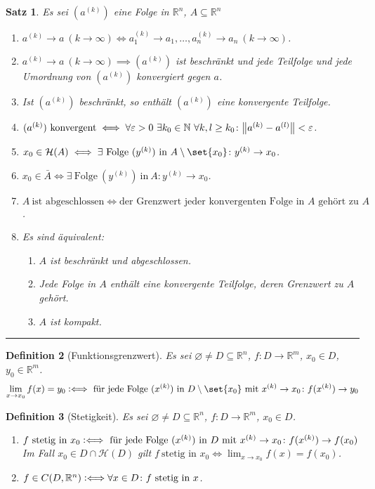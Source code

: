 \documentclass[a4paper]{article}
\newcounter{Sec}
\theoremstyle{marginbreak}
\newtheorem{definition}{Definition}[Sec]
\newtheorem{satz}[definition]{Satz}
\newcommand{\sep}{%
	\rule{\textwidth}{0.3pt}%
	\stepcounter{Sec}%
	}
\newcommand{\defiff}{\mathrel{\vcentcolon\Longleftrightarrow}}
\begin{document}
	\begin{satz}
		Es sei $(a^{(k)})$ eine Folge in $\mathbb{R}^n$, $A\subseteq\mathbb{R}^n$
		\begin{enumerate}[label=(\alph*)]
			\item $a^{(k)}\to a\ (k\to\infty)\iff a_1^{(k)}\to a_1,\ldots,a_n^{(k)}\to a_n\ (k\to\infty)$.
			\item $a^{(k)}\to a\ (k\to\infty)\implies (a^{(k)})$ ist beschränkt und jede Teilfolge und jede Umordnung
				von $(a^{(k)})$ konvergiert gegen $a$.
			\item Ist $(a^{(k)})$ beschränkt, so enthält $(a^{(k)})$ eine konvergente Teilfolge.
			\item $(a^{(k)})\ \text{konvergent}\iff\forall\varepsilon>0\ \exists k_0\in\mathbb{N}\ \forall k, l\geq k_0\colon
				\norm{a^{(k)} - a^{(l)}}<\varepsilon$.
			\item $x_0\in\mathcal{H}(A) \iff\exists\ \text{Folge}\ (y^{(k)})\ \text{in}\ A\setminus\set{x_0}\colon y^{(k)}\to x_0$.
			\item $x_0\in\bar{A}\iff\exists\ \text{Folge}\ (y^{(k)})\ \text{in}\ A\colon y^{(k)}\to x_0$.
			\item $A\ \text{ist abgeschlossen} \iff \text{der Grenzwert jeder konvergenten Folge in $A$ gehört zu $A$}$.
			\item Es sind äquivalent:
				\begin{enumerate}[label=(\roman*)]
					\item $A$ ist beschränkt und abgeschlossen.
					\item Jede Folge in $A$ enthält eine konvergente Teilfolge, deren Grenzwert zu $A$ gehört.
					\item $A$ ist kompakt.
				\end{enumerate}
		\end{enumerate}
	\end{satz}
	\sep
	\begin{definition}[Funktionsgrenzwert]
		Es sei $\varnothing\neq D\subseteq\mathbb{R}^n$, $f\colon D\to\mathbb{R}^m$, $x_0\in D$, $y_0\in\mathbb{R}^m$.
		\[\lim_{x\to x_0}f(x) = y_0\defiff\ \text{für jede Folge $(x^{(k)})$ in $D\setminus\set{x_0}$ mit $x^{(k)}\to x_0$}\colon
		f(x^{(k)})\to y_0\]
	\end{definition}
	\begin{definition}[Stetigkeit]
		Es sei $\varnothing\neq D\subseteq\mathbb{R}^n$, $f\colon D\to\mathbb{R}^m$, $x_0\in D$.
		\begin{enumerate}[label=(\alph*)]
			\item
				$f\ \text{stetig in $x_0$}\defiff\ \text{für jede Folge $(x^{(k)})$ in $D$ mit $x^{(k)}\to x_0$}\colon f(x^{(k)})\to f(x_0)$
				Im Fall $x_0\in D\cap\mathcal{H}(D)$ gilt $f\ \text{stetig in $x_0$}\iff \lim_{x\to x_0} f(x) = f(x_0)$.
			\item $f\in C(D, \mathbb{R}^n)\defiff\forall x\in D\colon f\ \text{stetig in $x$}$.
		\end{enumerate}
	\end{definition}
\end{document}
